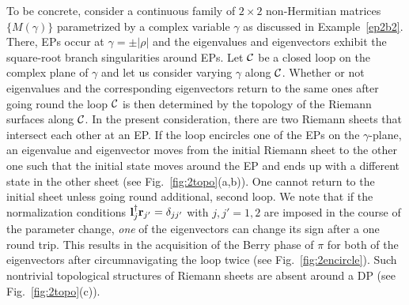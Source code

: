 \documentclass{tADP2e}
\theoremstyle{plain}
\theoremstyle{plain}
\theoremstyle{definition}
\begin{document}
To be concrete, consider a continuous family of $2\times 2$ non-Hermitian matrices $\{M(\gamma)\}$ parametrized by a complex variable $\gamma$ as discussed in Example~\ref{ep2b2}. There, EPs occur at $\gamma=\pm|\rho|$ and the eigenvalues and eigenvectors exhibit the square-root branch singularities around EPs. 
Let $\cal C$ be a closed loop on the complex plane of $\gamma$ and let us consider varying $\gamma$ along $\cal C$. Whether or not eigenvalues and the corresponding eigenvectors  return to the same ones after going round the loop $\cal C$ is then determined by the topology of the Riemann surfaces along $\cal C$. In the present consideration, there are two Riemann sheets that intersect each other at an EP. If the loop encircles one of the EPs on the $\gamma$-plane, an eigenvalue and eigenvector moves from the initial Riemann sheet to the other one such that the initial state moves around the EP and ends up with a different state in the other sheet \cite{DC01,UR12} (see Fig.~\ref{fig:2topo}(a,b)). One  cannot return to the initial sheet unless going round additional, second loop. We note that if the normalization conditions ${\bf l}^\dagger_{j}{\bf r}_{j'}=\delta_{jj'}$ with $j,j'=1,2$ are imposed in the course of the parameter change, {\it one} of the eigenvectors can change its sign after a one round trip. This results in the acquisition of the Berry phase of $\pi$ for both of the eigenvectors after circumnavigating the loop twice  \cite{DC04,MAA05,LR09,WDH12,GT15} (see Fig.~\ref{fig:2encircle}). Such nontrivial topological structures of Riemann sheets are absent around a DP (see Fig.~\ref{fig:2topo}(c)).
\end{document}
